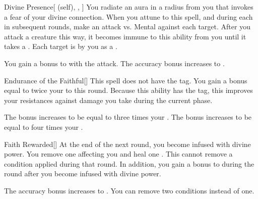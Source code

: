\lowercase{\hypertarget{spell:Divine Presence}{}}\label{spell:Divine Presence}
\begin{attuneability}[Rank 3]{\hypertarget{spell:Divine Presence}{Divine Presence}}[ (self), , ]
You radiate an aura in a \areasmall radius  from you that invokes a fear of your divine connection.
When you attune to this spell, and during each  in subsequent rounds, make an attack vs. Mental against each target.
After you attack a creature this way, it becomes immune to this ability from you until it takes a .
\hit Each target is  by you as a .

\rankline
{} You gain a  bonus to  with the attack.
 The accuracy bonus increases to .

\end{attuneability}
\vspace{0.25em}



\lowercase{\hypertarget{spell:Endurance of the Faithful}{}}\label{spell:Endurance of the Faithful}
\begin{freeability}[Rank 3]{\hypertarget{spell:Endurance of the Faithful}{Endurance of the Faithful}}[]
This spell does not have the  tag.
You gain a bonus equal to twice your  to  this round.
Because this ability has the  tag, this improves your resistances against damage you take during the current phase.

\rankline
{} The bonus increases to be equal to three times your .
 The bonus increases to be equal to four times your .

\end{freeability}
\vspace{0.25em}



\lowercase{\hypertarget{spell:Faith Rewarded}{}}\label{spell:Faith Rewarded}
\begin{freeability}[Rank 3]{\hypertarget{spell:Faith Rewarded}{Faith Rewarded}}[]
At the end of the next round, you become infused with divine power.
You remove one  affecting you and heal one .
This cannot remove a condition applied during that round.
In addition, you gain a  bonus to  during the round after you become infused with divine power.

\rankline
{} The accuracy bonus increases to .
 You can remove two conditions instead of one.

\end{freeability}
\vspace{0.25em}



